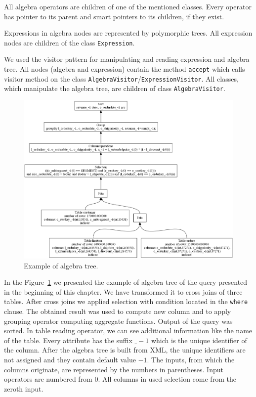 All algebra operators are children of one of the mentioned classes. Every operator has pointer to its parent and smart pointers to its children, if they exist. 

Expressions in algebra nodes are represented by polymorphic trees. All expression nodes are children of the class \texttt{Expression}.

We used the visitor pattern for manipulating and reading expression and algebra tree. All nodes (algebra and expression) contain the method \texttt{accept} which calls visitor method on the class \texttt{AlgebraVisitor}/\texttt{ExpressionVisitor}. All classes, which manipulate the algebra tree, are children of class \texttt{AlgebraVisitor}.


\begin{figure}[h!]
  \centering
    \includegraphics[width=1.0\textwidth]{algebratree1}

      \caption{Example of algebra tree.}
          \label{fig:algebratree1}
\end{figure}

In the Figure~\ref{fig:algebratree1} we presented the example of algebra tree of the query presented in the beginning of this chapter. We have transformed it to cross joins of three tables. After cross joins we applied selection with condition located in the \verb|where| clause. The obtained result was used to compute new column and to apply grouping operator computing aggregate functions. Output of the query was sorted. In table reading operator, we can see additional information like the name of the table. Every attribute has the suffix $\_-1$ which is the unique identifier of the column. After the algebra tree is built from XML, the unique identifiers are not assigned and they contain default value $-1$. The inputs, from which the columns originate, are represented by the numbers in parentheses. Input operators are numbered from $0$. All columns in used selection come from the zeroth input.

